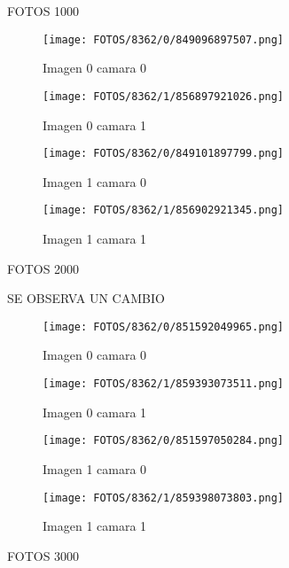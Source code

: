 \documentclass{article}
\begin{document}
FOTOS 1000

\begin{figure}[H]
  \centering
  \begin{minipage}[b]{0.45\textwidth}
    \centering
    \texttt{[image: FOTOS/8362/0/849096897507.png]}
    \caption{Imagen 0 camara 0}
  \end{minipage}
  \begin{minipage}[b]{0.45\textwidth}
    \centering
    \texttt{[image: FOTOS/8362/1/856897921026.png]}
    \caption{Imagen 0 camara 1}
  \end{minipage}
  \begin{minipage}[b]{0.45\textwidth}
    \centering
    \texttt{[image: FOTOS/8362/0/849101897799.png]}
    \caption{Imagen 1 camara 0}
  \end{minipage}
  \begin{minipage}[b]{0.45\textwidth}
    \centering
    \texttt{[image: FOTOS/8362/1/856902921345.png]}
    \caption{Imagen 1 camara 1}
  \end{minipage}
\end{figure}

FOTOS 2000

SE OBSERVA UN CAMBIO

\begin{figure}[H]
  \centering
  \begin{minipage}[b]{0.45\textwidth}
    \centering
    \texttt{[image: FOTOS/8362/0/851592049965.png]}
    \caption{Imagen 0 camara 0}
  \end{minipage}
  \begin{minipage}[b]{0.45\textwidth}
    \centering
    \texttt{[image: FOTOS/8362/1/859393073511.png]}
    \caption{Imagen 0 camara 1}
  \end{minipage}
  \begin{minipage}[b]{0.45\textwidth}
    \centering
    \texttt{[image: FOTOS/8362/0/851597050284.png]}
    \caption{Imagen 1 camara 0}
  \end{minipage}
  \begin{minipage}[b]{0.45\textwidth}
    \centering
    \texttt{[image: FOTOS/8362/1/859398073803.png]}
    \caption{Imagen 1 camara 1}
  \end{minipage}
\end{figure}


FOTOS 3000
\end{document}
